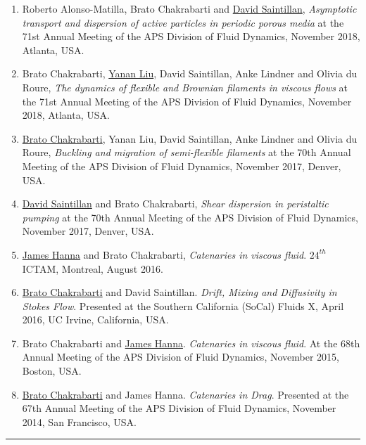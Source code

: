 \documentclass[10pt]{res} %
\begin{document}
\begin{resume}
\begin{enumerate}
\item Roberto Alonso-Matilla, Brato Chakrabarti and \underline{David Saintillan}, \textit{Asymptotic transport and dispersion of active particles in periodic porous media} at the 71st Annual Meeting of the APS Division of Fluid Dynamics, November 2018, Atlanta, USA. 

\item Brato Chakrabarti, \underline{Yanan Liu}, David Saintillan, Anke Lindner and Olivia du Roure, \textit{The dynamics of flexible and Brownian filaments in viscous flows} at the 71st Annual Meeting of the APS Division of Fluid Dynamics, November 2018, Atlanta, USA. 

\item \underline{Brato Chakrabarti}, Yanan Liu, David Saintillan, Anke Lindner and Olivia du Roure, \textit{Buckling and migration of semi-flexible filaments} at the 70th Annual Meeting of the APS Division of Fluid Dynamics, November 2017,
Denver, USA. 

\item \underline{David Saintillan} and Brato Chakrabarti, \textit{Shear dispersion in peristaltic pumping} at the 70th Annual Meeting of the APS Division of Fluid Dynamics, November 2017,
Denver, USA. 

\item \underline{James Hanna} and Brato Chakrabarti, \textit{Catenaries in viscous fluid}. $24^{th}$ ICTAM, Montreal, August 2016.

\item \underline{Brato Chakrabarti} and David Saintillan. \textit{Drift, Mixing and Diffusivity in 
	Stokes Flow}. Presented at the Southern California (SoCal) Fluids X, April 2016, UC Irvine, California, USA.

\item Brato Chakrabarti and \underline{James Hanna}. \textit{Catenaries in viscous fluid}. At the 68th Annual Meeting of the APS Division of Fluid Dynamics, November 2015,
Boston, USA. 

\item \underline{Brato Chakrabarti} and James Hanna. \textit{Catenaries in Drag}. Presented at the 67th Annual Meeting of the APS Division of Fluid Dynamics, November 2014,
San Francisco, USA. 
	
\end{enumerate}

\vspace*{-2mm}
\noindent\rule{\textwidth}{0.6pt}
\vspace*{-7mm}

\end{resume}
\end{document}

